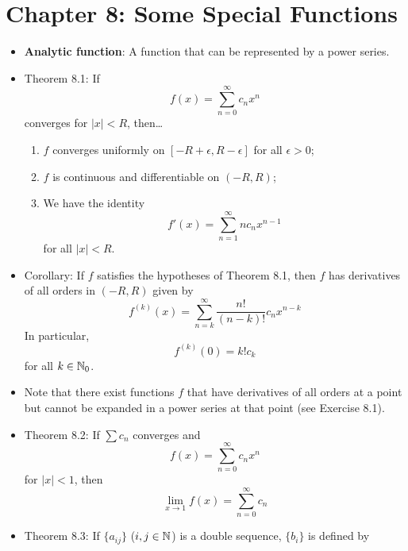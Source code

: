 \documentclass[../notes.tex]{subfiles}
\begin{document}
\section{Chapter 8: Some Special Functions}
\begin{itemize}
    \item {}\textbf{Analytic function}: A function that can be represented by a power series.
    \item Theorem 8.1: If
    \begin{equation*}
        f(x) = \sum_{n=0}^\infty c_nx^n
    \end{equation*}
    converges for $|x|<R$, then\dots
    \begin{enumerate}
        \item $f$ converges uniformly on $[-R+\epsilon,R-\epsilon]$ for all $\epsilon>0$;
        \item $f$ is continuous and differentiable on $(-R,R)$;
        \item We have the identity
        \begin{equation*}
            f'(x) = \sum_{n=1}^\infty nc_nx^{n-1}
        \end{equation*}
        for all $|x|<R$.
    \end{enumerate}
    \item Corollary: If $f$ satisfies the hypotheses of Theorem 8.1, then $f$ has derivatives of all orders in $(-R,R)$ given by
    \begin{equation*}
        f^{(k)}(x) = \sum_{n=k}^\infty\frac{n!}{(n-k)!}c_nx^{n-k}
    \end{equation*}
    In particular,
    \begin{equation*}
        f^{(k)}(0) = k!c_k
    \end{equation*}
    for all $k\in\mathbb{N}_0$.
    \item Note that there exist functions $f$ that have derivatives of all orders at a point but cannot be expanded in a power series at that point (see Exercise 8.1).
    \item Theorem 8.2: If $\sum c_n$ converges and
    \begin{equation*}
        f(x) = \sum_{n=0}^\infty c_nx^n
    \end{equation*}
    for $|x|<1$, then
    \begin{equation*}
        \lim_{x\to 1}f(x) = \sum_{n=0}^\infty c_n
    \end{equation*}
    \item Theorem 8.3: If $\{a_{ij}\}$ ($i,j\in\mathbb{N}$) is a double sequence, $\{b_i\}$ is defined by

\end{itemize}
\end{document}

